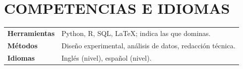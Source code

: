 \section{COMPETENCIAS E IDIOMAS}
\begin{tabularx}{\linewidth}{@{}lX@{}}
\textbf{Herramientas} & Python, R, SQL, LaTeX; indica las que dominas.\\[3pt]
\textbf{Métodos} & Diseño experimental, análisis de datos, redacción técnica.\\[3pt]
\textbf{Idiomas} & Inglés (nivel), español (nivel).\\
\end{tabularx}
